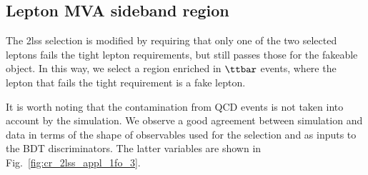 \subsection{Lepton MVA sideband region}

The 2lss selection is modified by requiring that only one of the two selected leptons fails the tight lepton requirements, but still passes those for the fakeable object. In this way, we select a region enriched in $\ttbar$ events, where the lepton that fails the tight requirement is a fake lepton.

It is worth noting that the contamination from QCD events is not taken into account by the simulation. We observe a good agreement between simulation and data in terms of the shape of observables used for the selection and as inputs to the BDT discriminators. The latter variables are shown in Fig.~\ref{fig:cr_2lss_appl_1fo_3}.


